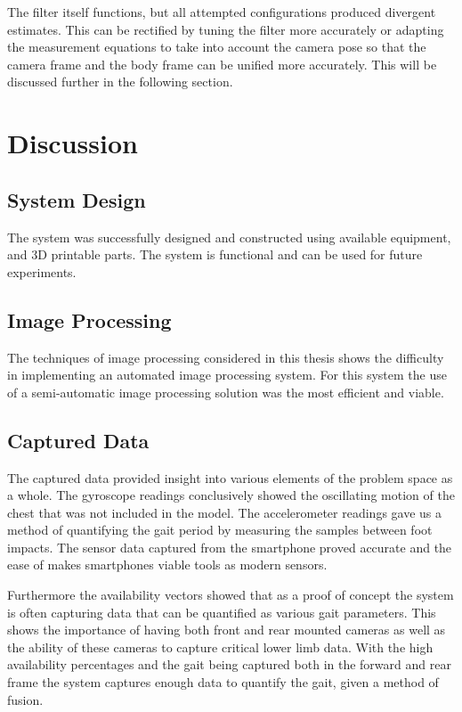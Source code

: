 The filter itself functions, but all attempted configurations produced divergent estimates. This can be rectified by tuning the filter more accurately or adapting the measurement equations to take into account the camera pose so that the camera frame and the body frame can be unified more accurately. This will be discussed further in the following section.

\section{Discussion}

\subsection{System Design}
The system was successfully designed and constructed using available equipment, and 3D printable parts. The system is functional and can be used for future experiments. 

\subsection{Image Processing}
The techniques of image processing considered in this thesis shows the difficulty in implementing an automated image processing system. For this system the use of a semi-automatic image processing solution was the most efficient and viable. 

\subsection{Captured Data}
The captured data provided insight into various elements of the problem space as a whole. The gyroscope readings conclusively showed the oscillating motion of the chest that was not included in the model. The accelerometer readings gave us a method of quantifying the gait period by measuring the samples between foot impacts. The sensor data captured from the smartphone proved accurate and the ease of makes smartphones viable tools as modern sensors.

Furthermore the availability vectors showed that as a proof of concept the system is often capturing data that can be quantified as various gait parameters. This shows the importance of having both front and rear mounted cameras as well as the ability of these cameras to capture critical lower limb data. With the high availability percentages and the gait being captured both in the forward and rear frame the system captures enough data to quantify the gait, given a method of fusion.

